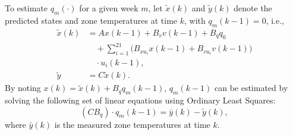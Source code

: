 To estimate $q_{m}(\cdot)$ for a given week $m$, let $\tilde x(k)$ and $\tilde{y}(k)$ denote the predicted states and zone temperatures at time $k$, with $q_{m}(k-1) = 0$, i.e.,
\begin{equation}\label{Eq:xnoig_ynoig}
	\begin{aligned}
	\tilde x(k) & = Ax(k-1)+B_v v(k-1) + B_q q_0 \\
		& \quad + \textstyle \sum_{i=1}^{21} \big( B_{xu_i} x(k-1) + B_{vu_i} v(k-1) \big) \\
		& \quad \cdot u_{i}(k-1), \\
	\tilde y & = C \tilde x(k).
	\end{aligned}
\end{equation} 
By noting $x(k) = \tilde{x}(k) + B_q q_m(k-1)$, $q_{m}(k-1)$ can be estimated by solving the following set of linear equations using Ordinary Least Squares:
\begin{equation}\label{Eq:ig(k-1)}
(C B_q) \cdot q_{m}(k-1) = \bar{y}(k) - \tilde{y}(k),
\end{equation}
where $\bar{y}(k)$ is the measured zone temperatures at time $k$.  


